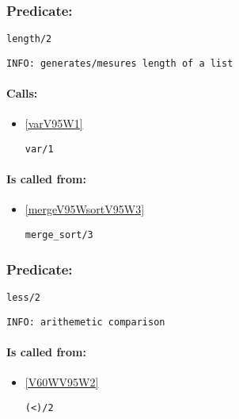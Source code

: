 \subsubsection{Predicate:} \label{lengthV95W2}

\begin{verbatim}
length/2
\end{verbatim}

{\small \begin{verbatim}
INFO: generates/mesures length of a list

\end{verbatim}}
\paragraph{Calls:} 
\begin{itemize}
\item \ref{varV95W1} 
\begin{verbatim}
var/1
\end{verbatim}

\end{itemize}
\paragraph{Is called from:} 
\begin{itemize}
\item \ref{mergeV95WsortV95W3} 
\begin{verbatim}
merge_sort/3
\end{verbatim}

\end{itemize}

\subsubsection{Predicate:} \label{lessV95W2}

\begin{verbatim}
less/2
\end{verbatim}

{\small \begin{verbatim}
INFO: arithemetic comparison

\end{verbatim}}
\paragraph{Is called from:} 
\begin{itemize}
\item \ref{V60WV95W2} 
\begin{verbatim}
(<)/2
\end{verbatim}

\end{itemize}

